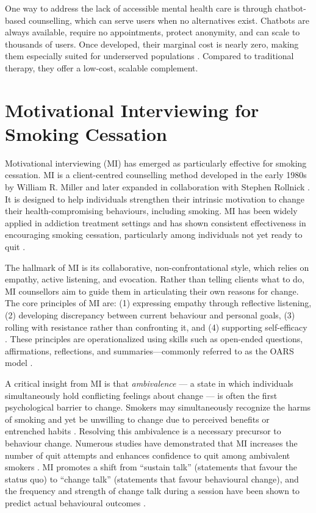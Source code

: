 One way to address the lack of accessible mental health care is through chatbot-based counselling, which can serve users when no alternatives exist. Chatbots are always available, require no appointments, protect anonymity, and can scale to thousands of users. Once developed, their marginal cost is nearly zero, making them especially suited for underserved populations \cite{torous2017digital,miner2016smartphone}. Compared to traditional therapy, they offer a low-cost, scalable complement.



\section{Motivational Interviewing for Smoking Cessation}

Motivational interviewing (MI) has emerged as particularly effective for smoking cessation. MI is a client-centred counselling method developed in the early 1980s by William R. Miller and later expanded in collaboration with Stephen Rollnick \cite{miller1991motivational,MillerRollnick2023}. It is designed to help individuals
strengthen their intrinsic motivation to change their health-compromising behaviours, including smoking. MI has been widely applied in addiction treatment settings and has shown consistent effectiveness in encouraging smoking cessation, particularly among individuals not yet ready to quit \cite{bischof2021evidence,hettema2005meta}.

The hallmark of MI is its collaborative, non-confrontational style, which relies on empathy, active listening, and evocation. Rather than telling clients what to do, MI counsellors aim to guide them in articulating their own reasons for change. The core principles of MI are: (1) expressing empathy through reflective listening, (2) developing discrepancy between current behaviour and personal goals, (3) rolling with resistance rather than confronting it, and (4) supporting self-efficacy \cite{rollnick2008motivational}. These principles are operationalized using skills such as open-ended questions, affirmations, reflections, and summaries---commonly referred to as the OARS model \cite{Miller_2023}.


A critical insight from MI is that \emph{ambivalence} --- a state in which individuals simultaneously hold conflicting feelings about change --- is often the first psychological barrier to change. Smokers may simultaneously recognize the harms of smoking and yet be unwilling to change due to perceived benefits or entrenched habits \cite{brown2023mi}. Resolving this ambivalence is a necessary precursor to behaviour change. Numerous studies have demonstrated that MI increases the number of quit attempts and enhances confidence to quit among ambivalent smokers \cite{Abar2013, Gwaltney2009-wj}. MI promotes a shift from ``sustain talk'' (statements that favour the status quo) to ``change talk'' (statements that favour behavioural change), and the frequency and strength of change talk during a session have been shown to predict actual behavioural outcomes \cite{Apodaca2009}.

